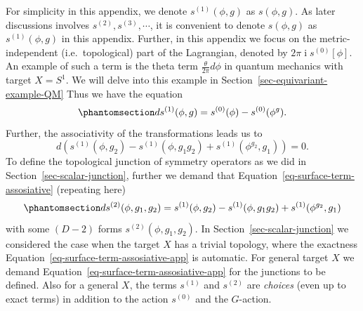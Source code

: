 \documentclass[11pt,toc=bibliography]{scrbook}
\DeclareMathOperator{\imunit}{i}
\numberwithin{equation}{section}
\DeclareMathOperator{\imunit}{i}
\begin{document}
For simplicity in this appendix, we denote \(s^{(1)}(\phi,g)\) as
\(s(\phi,g)\). As later discussions involves
\(s^{(2)}, s^{(3)},\cdots\), it is convenient to denote \(s(\phi, g)\)
as \(s^{(1)}(\phi,g)\) in this appendix. Further, in this appendix we
focus on the metric-independent (i.e.~topological) part of the
Lagrangian, denoted by \(2\pi\imunit s^{(0)}[\phi]\). An example of such
a term is the theta term \(\frac{\theta}{2\pi} d\phi\) in quantum
mechanics with target \(X=S^1\). We will delve into this example in
Section~\ref{sec-equivariant-example-QM} Thus we have the equation
\begin{equation}\phantomsection\label{eq-surface-term-def}{
ds^{(1)}(\phi,g) = s^{(0)}(\phi) - s^{(0)}(\phi^g).
}\end{equation} Further, the associativity of the transformations leads
us to \[
d(s^{(1)}(\phi,g_2) - s^{(1)}(\phi,g_1g_2) + s^{(1)}(\phi^{g_2},g_1))= 0.
\] To define the topological junction of symmetry operators as we did in
Section~\ref{sec-scalar-junction}, further we demand that
Equation~\ref{eq-surface-term-assosiative} (repeating here)
\begin{equation}\phantomsection\label{eq-surface-term-assosiative-app}{ 
ds^{(2)}(\phi,g_1,g_2) = s^{(1)}(\phi,g_2) - s^{(1)}(\phi,g_1g_2) + s^{(1)}(\phi^{g_2},g_1)
}\end{equation} with some \((D-2)\) forms \(s^{(2)}(\phi,g_1,g_2)\). In
Section~\ref{sec-scalar-junction} we considered the case when the target
\(X\) has a trivial topology, where the exactness
Equation~\ref{eq-surface-term-assosiative-app} is automatic. For general
target \(X\) we demand Equation~\ref{eq-surface-term-assosiative-app}
for the junctions to be defined. Also for a general \(X\), the terms
\(s^{(1)}\) and \(s^{(2)}\) are \emph{choices} (even up to exact terms)
in addition to the action \(s^{(0)}\) and the \(G\)-action.
\end{document}
